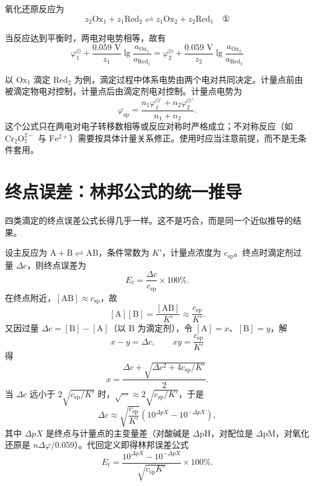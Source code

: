 \documentclass[UTF8]{ctexbook}
\begin{document}
氧化还原反应为
\[
z_2\text{Ox}_1 + z_1\text{Red}_2 \rightleftharpoons z_1\text{Ox}_2 + z_2\text{Red}_1 \quad ①
\]

当反应达到平衡时，两电对电势相等，故有
\[
\varphi_1^\ominus + \frac{0.059\text{ V}}{z_1} \lg \frac{a_{\text{Ox}_1}}{a_{\text{Red}_1}} = \varphi_2^\ominus + \frac{0.059\text{ V}}{z_2} \lg \frac{a_{\text{Ox}_2}}{a_{\text{Red}_2}}
\]

以 $\mathrm{Ox}_1$ 滴定 $\mathrm{Red}_2$ 为例，滴定过程中体系电势由两个电对共同决定。计量点前由被滴定物电对控制，计量点后由滴定剂电对控制。计量点电势为
\[
\varphi_{\mathrm{sp}}=\frac{n_1\varphi_1^{\ominus'}+n_2\varphi_2^{\ominus'}}{n_1+n_2}.
\]
这个公式只在两电对电子转移数相等或反应对称时严格成立；不对称反应（如 $\mathrm{Cr_2O_7^{2-}}$ 与 $\mathrm{Fe^{2+}}$）需要按具体计量关系修正。使用时应当注意前提，而不是无条件套用。

\newpage
\section{终点误差：林邦公式的统一推导}

四类滴定的终点误差公式长得几乎一样。这不是巧合，而是同一个近似推导的结果。

设主反应为 $\mathrm{A}+\mathrm{B}\rightleftharpoons\mathrm{AB}$，条件常数为 $K'$，计量点浓度为 $c_{\mathrm{sp}}$。终点时滴定剂过量 $\Delta c$，则终点误差为
\[
E_t=\frac{\Delta c}{c_{\mathrm{sp}}}\times100\%.
\]
在终点附近，$[\mathrm{AB}]\approx c_{\mathrm{sp}}$，故
\[
[\mathrm{A}][\mathrm{B}]=\frac{[\mathrm{AB}]}{K'}\approx\frac{c_{\mathrm{sp}}}{K'}.
\]
又因过量 $\Delta c=[\mathrm{B}]-[\mathrm{A}]$（以 $\mathrm{B}$ 为滴定剂），令 $[\mathrm{A}]=x$、$[\mathrm{B}]=y$，解
\[
x-y=\Delta c,\qquad xy=\frac{c_{\mathrm{sp}}}{K'}
\]
得
\[
x=\frac{\Delta c+\sqrt{\Delta c^2+4c_{\mathrm{sp}}/K'}}{2}.
\]
当 $\Delta c$ 远小于 $2\sqrt{c_{\mathrm{sp}}/K'}$ 时，$\sqrt{\cdots}\approx2\sqrt{c_{\mathrm{sp}}/K'}$，于是
\[
\Delta c\approx\sqrt{\frac{c_{\mathrm{sp}}}{K'}}\left(10^{\Delta pX}-10^{-\Delta pX}\right),
\]
其中 $\Delta pX$ 是终点与计量点的主变量差（对酸碱是 $\Delta\mathrm{pH}$，对配位是 $\Delta\mathrm{pM}$，对氧化还原是 $n\Delta\varphi/0.059$）。代回定义即得林邦误差公式
\[
E_t=\frac{10^{\Delta pX}-10^{-\Delta pX}}{\sqrt{c_{\mathrm{sp}}K'}}\times100\%.
\]
\end{document}
